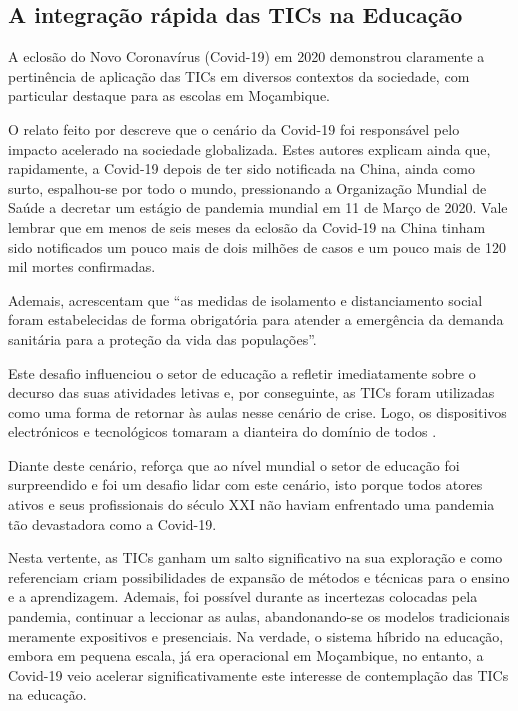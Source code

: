 \documentclass[portuguese]{textolivre}
\begin{document}
\subsection{A integração rápida das TICs na Educação}
A eclosão do Novo Coronavírus (Covid-19) em 2020 demonstrou claramente a pertinência de aplicação das TICs em diversos contextos da sociedade, com particular destaque para as escolas em Moçambique.

O relato feito por \textcite{cruz2021} descreve que o cenário da Covid-19 foi responsável pelo impacto acelerado na sociedade globalizada. Estes autores explicam ainda que, rapidamente, a Covid-19 depois de ter sido notificada na China, ainda como surto, espalhou-se por todo o mundo, pressionando a Organização Mundial de Saúde a decretar um estágio de pandemia mundial em 11 de Março de 2020. Vale lembrar que em menos de seis meses da eclosão da Covid-19 na China tinham sido notificados um pouco mais de dois milhões de casos e um pouco mais de 120 mil mortes confirmadas.

Ademais, \textcite[p. 2]{menezes2021} acrescentam que ``as medidas de isolamento e distanciamento social foram estabelecidas de forma obrigatória para atender a emergência da demanda sanitária para a proteção da vida das populações''.

Este desafio influenciou o setor de educação a refletir imediatamente sobre o decurso das suas atividades letivas e, por conseguinte, as TICs foram utilizadas como uma forma de retornar às aulas nesse cenário de crise. Logo, os dispositivos electrónicos e tecnológicos tomaram a dianteira do domínio de todos \cite{menezes2021}.

Diante deste cenário, \textcite{doring2021} reforça que ao nível mundial o setor de educação foi surpreendido e foi um desafio lidar com este cenário, isto porque todos atores ativos e seus profissionais do século XXI não haviam enfrentado uma pandemia tão devastadora como a Covid-19.

Nesta vertente, as TICs ganham um salto significativo na sua exploração e como referenciam \textcite{cruz2021} criam possibilidades de expansão de métodos e técnicas para o ensino e a aprendizagem. Ademais, foi possível durante as incertezas colocadas pela pandemia, continuar a leccionar as aulas, abandonando-se os modelos tradicionais meramente expositivos e presenciais. Na verdade, o sistema híbrido na educação, embora em pequena escala, já era operacional em Moçambique, no entanto, a Covid-19 veio acelerar significativamente este interesse de contemplação das TICs na educação.
\end{document}
